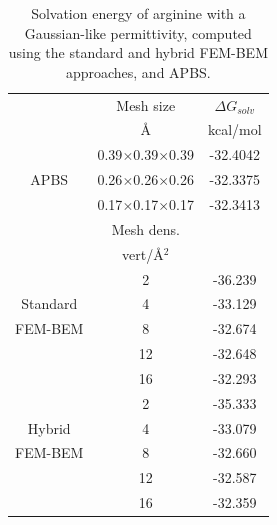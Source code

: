 \begin{table}
\centering
\begin{tabular}{c|c|c}
&Mesh size & $\Delta G_{solv}$\\
&\AA       &  kcal/mol \\
\hline
\multirow{3}{*}{APBS}& 0.39$\times$0.39$\times$0.39 & -32.4042\\ 
&0.26$\times$0.26$\times$0.26 & -32.3375\\ 
&0.17$\times$0.17$\times$0.17 & -32.3413\\ 
\hline
&Mesh dens. & \\
&vert/\AA$^2$ & \\
\hline
    & 2 & -36.239\\
Standard    & 4  & -33.129 \\
FEM-BEM    & 8  & -32.674 \\
    & 12 & -32.648 \\
    & 16 & -32.293 \\
\hline
    & 2 & -35.333\\
Hybrid    & 4  & -33.079 \\
FEM-BEM    & 8  & -32.660 \\
    & 12 & -32.587 \\
    & 16 & -32.359 \\
\hline
\end{tabular}
\caption{Solvation energy of arginine with a Gaussian-like permittivity, computed using the standard and hybrid FEM-BEM approaches, and APBS.}
\label{table:arg_variable}
\end{table}

